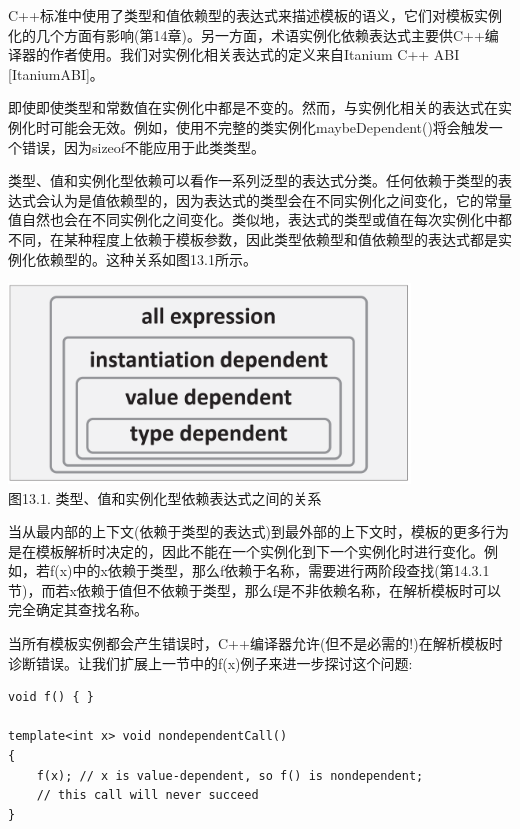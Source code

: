 \begin{tcolorbox}[colback=webgreen!5!white,colframe=webgreen!75!black]
\hspace*{0.75cm}C++标准中使用了类型和值依赖型的表达式来描述模板的语义，它们对模板实例化的几个方面有影响(第14章)。另一方面，术语实例化依赖表达式主要供C++编译器的作者使用。我们对实例化相关表达式的定义来自Itanium C++ ABI [ItaniumABI]。
\end{tcolorbox}

即使即使类型和常数值在实例化中都是不变的。然而，与实例化相关的表达式在实例化时可能会无效。例如，使用不完整的类实例化maybeDependent()将会触发一个错误，因为sizeof不能应用于此类类型。

类型、值和实例化型依赖可以看作一系列泛型的表达式分类。任何依赖于类型的表达式会认为是值依赖型的，因为表达式的类型会在不同实例化之间变化，它的常量值自然也会在不同实例化之间变化。类似地，表达式的类型或值在每次实例化中都不同，在某种程度上依赖于模板参数，因此类型依赖型和值依赖型的表达式都是实例化依赖型的。这种关系如图13.1所示。

\begin{center}
\includegraphics[width=0.8\textwidth]{content/2/chapter13/images/1.png} \\
图13.1. 类型、值和实例化型依赖表达式之间的关系
\end{center}

当从最内部的上下文(依赖于类型的表达式)到最外部的上下文时，模板的更多行为是在模板解析时决定的，因此不能在一个实例化到下一个实例化时进行变化。例如，若f(x)中的x依赖于类型，那么f依赖于名称，需要进行两阶段查找(第14.3.1节)，而若x依赖于值但不依赖于类型，那么f是不非依赖名称，在解析模板时可以完全确定其查找名称。


当所有模板实例都会产生错误时，C++编译器允许(但不是必需的!)在解析模板时诊断错误。让我们扩展上一节中的f(x)例子来进一步探讨这个问题:

\begin{lstlisting}[style=styleCXX]
void f() { }

template<int x> void nondependentCall()
{
	f(x); // x is value-dependent, so f() is nondependent;
	// this call will never succeed
}
\end{lstlisting}

